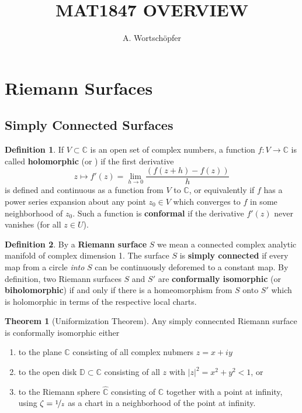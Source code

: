 \documentclass{article}
\title{MAT1847 OVERVIEW}
\author{A. Wortschöpfer}
\theoremstyle{definition}
\newtheorem{theorem}{Theorem}
\newtheorem*{defn}{Definition}
\begin{document}
    \maketitle

    \section{Riemann Surfaces}

    \subsection{Simply Connected Surfaces}

    \begin{defn}
        If $V\subset\mathbb{C}$ is an open set of complex numbers, a function $f:V\to\mathbb{C}$ is called \textbf{holomorphic}
        (or ) if the first derivative
        \[ z\mapsto f'(z) = \lim_{h\to 0}\frac{(f(z+h)-f(z))}{h} \]
        is defined and continuous as a function from $V$ to $\mathbb{C}$, or equivalently if $f$ has a power series expansion
        about any point $z_0\in V$ which converges to $f$ in some neighborhood of $z_0$. Such a function is \textbf{conformal}
        if the derivative $f'(z)$ never vanishes (for all $z\in U$).
    \end{defn}

    \begin{defn}
        By a \textbf{Riemann surface} $S$ we mean a connected complex analytic manifold of complex dimension 1. The surface
        $S$ is \textbf{simply connected} if every map from a circle \textit{into} $S$ can be continuously deforemed to a constant
        map. By definition, two Riemann surfaces $S$ and $S'$ are \textbf{conformally isomorphic} (or \textbf{biholomorphic}) 
        if and only if there is a homeomorphism from $S$ onto $S'$ which is holomorphic in terms of the respective local charts.
    \end{defn}

    \begin{theorem}[Uniformization Theorem]
        Any simply connecnted Riemann surface is conformally isomorphic either
        \begin{enumerate}
            \item to the plane $\mathbb{C}$ consisting of all complex nubmers $z=x+iy$
            \item to the open disk $\mathbb{D}\subset\mathbb{C}$ consisting of all $z$ with $|z|^2 = x^2 + y^2 < 1$, or
            \item to the Riemann sphere $\hat{\mathbb{C}}$ consisting of $\mathbb{C}$ together with a point at infinity,
                using $\zeta = \nicefrac{1}{z}$ as a chart in a neighborhood of the point at infinity.
        \end{enumerate}
    \end{theorem}
\end{document}
